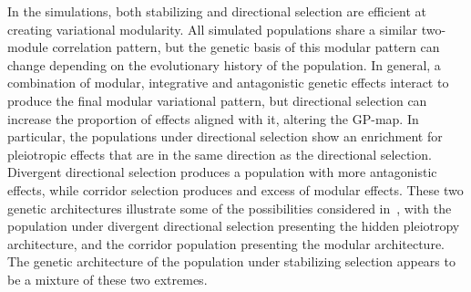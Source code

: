 \begin{refsection}
In the simulations, both stabilizing and directional selection are efficient
at creating variational modularity. All simulated populations share a similar
two-module correlation pattern, but the genetic basis of this modular pattern
can change depending on the evolutionary history of the population. In
general, a combination of modular, integrative and antagonistic genetic
effects interact to produce the final modular variational pattern, but
directional selection can increase the proportion of effects aligned with it,
altering the GP-map. In particular, the populations under directional
selection show an enrichment for pleiotropic effects that are in the same
direction as the directional selection. Divergent directional selection
produces a population with more antagonistic effects, while corridor selection
produces and excess of modular effects. These two genetic architectures
illustrate some of the possibilities considered in~\textcite{Pavlicev2011-xm},
with the population under divergent directional selection presenting the
hidden pleiotropy architecture, and the corridor population presenting the modular
architecture. The genetic architecture of the population under stabilizing
selection appears to be a mixture of these two extremes.


\end{refsection}

